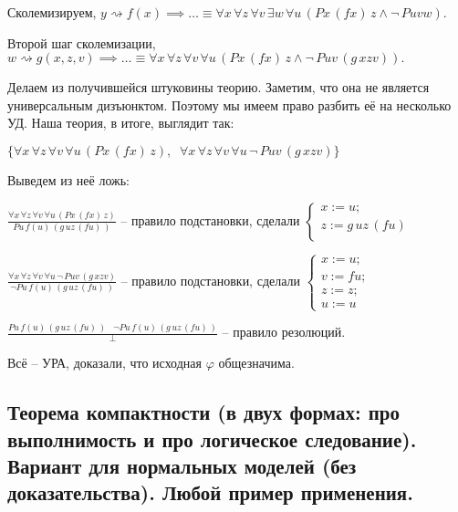 \documentclass[a4paper, fleqn]{article}
\begin{document}
    Сколемизируем, $y \rightsquigarrow f(x) \implies \dots \equiv \forall x  \, \forall z  \, \forall v \, \exists w \, \forall u \, (Px \, (fx)\, z \land  \neg \, Puvw).$
    
    Второй шаг сколемизации, $w \rightsquigarrow g(x,z,v) \implies \dots \equiv \forall x \, \forall z  \, \forall v \, \forall u \, (Px \, (fx)\, z \land  \neg \, Puv \, (g \, xzv)). $
    
    Делаем из получившейся штуковины теорию. Заметим, что она не является универсальным дизъюнктом. Поэтому мы имеем право разбить её на несколько УД. Наша теория, в итоге, выглядит так:
    
    $\{\forall x \, \forall z  \, \forall v \, \forall u \, (Px \, (fx)\, z )  , \; \; \forall x \, \forall z  \, \forall v \, \forall u \, \neg \, Puv \, (g \, xzv)\}$
    
    Выведем из неё ложь:
    
    $\frac{\forall x \, \forall z  \, \forall v \, \forall u \, (Px \, (fx)\, z )}{P u \, f(u)\, (g \, uz \, (fu)\,)}$ -- правило подстановки, сделали $\begin{cases}
    x := u; \\
    z := g \, uz \, (fu) \\
    \end{cases}$
    
    $ \frac{\forall x \, \forall z  \, \forall v \, \forall u \, \neg \, Puv \, (g \, xzv)}{\neg Pu \, f(u) \,(g \, uz \, (fu) \, )} $ -- правило подстановки, сделали $\begin{cases}
    x := u; \\
    v := fu; \\
    z := z; \\
    u := u
    \end{cases}$
    
    $\frac{P u \, f(u)\, (g \, uz \, (fu)\,)  \; \; \; \neg Pu \, f(u) \,(g \, uz \, (fu) \, ) }{\perp}$  -- правило резолюций.
    
    Всё -- УРА, доказали, что исходная  $\varphi$ общезначима.
    

    
    \subsection{Теорема компактности (в двух формах: про выполнимость и про логическое следование). Вариант для нормальных моделей (без доказательства). Любой пример применения.}
\end{document}
